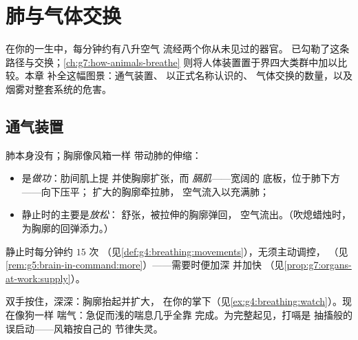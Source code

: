 \chapter{肺与气体交换}\label{ch:g7:lungs-and-gas-exchange}

在你的一生中，每分钟约有八升空气
流经两个你从未见过的器官。
已勾勒了这条路径与交换；\cref{ch:g7:how-animals-breathe}
则将人体装置置于界四大类群中加以比较。本章
补全这幅图景：通气装置、
以正式名称认识的、
气体交换的数量，以及烟雾对整套系统的危害。

\section{通气装置}

\begin{proposition}[空气如何进出]\label{prop:g7:lungs-and-gas-exchange:ventilation}
肺本身没有；胸廓像风箱一样
带动肺的伸缩：
\begin{itemize}
  \item {}是\emph{做功}：肋间肌上提
        并使胸廓扩张，而
        \emph{膈肌}——宽阔的
        底板，位于肺下方——向下压平；
        扩大的胸廓牵拉肺，
        空气流入以充满肺；
  \item 静止时的主要是\emph{放松}：
        舒张，被拉伸的胸廓弹回，
        空气流出。（吹熄蜡烛时，
        为胸廓的回弹添力。）
\end{itemize}
静止时每分钟约 $15$ 次
（见\cref{def:g4:breathing:movements}），无须主动调控，
（见\cref{rem:g5:brain-in-command:more}）——需要时便加深
并加快
（见\cref{prop:g7:organs-at-work:supply}）。
\end{proposition}
\admitted

\begin{example}[感受“风箱”]\label{ex:g7:lungs-and-gas-exchange:feel}
双手按住，深深：胸廓抬起并扩大，
在你的掌下（见\cref{ex:g4:breathing:watch}）。现在像狗一样
喘气：急促而浅的喘息几乎全靠
完成。为完整起见，打嗝是
抽搐般的误启动——风箱按自己的
节律失灵。
\end{example}

